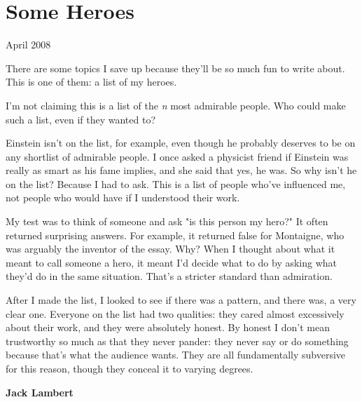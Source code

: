 \chapter{Some Heroes}


            
              
                

April 2008

There are some topics I save up because
                  they'll be so much fun to write about. This is one of them: a
                  list of my heroes.

I'm not claiming this is a list
                  of the \emph{n} most admirable people. Who could make such a
                  list, even if they wanted to?

Einstein isn't on the
                  list, for example, even though he probably deserves to be on
                  any shortlist of admirable people. I once asked a physicist
                  friend if Einstein was really as smart as his fame implies,
                  and she said that yes, he was. So why isn't he on the list?
                  Because I had to ask. This is a list of people who've
                  influenced me, not people who would have if I understood their
                  work.

My test was to think of someone and ask "is
                  this person my hero?" It often returned surprising answers.
                  For example, it returned false for Montaigne, who was arguably
                  the inventor of the essay. Why? When I thought about what it
                  meant to call someone a hero, it meant I'd decide what to do
                  by asking what they'd do in the same situation. That's a
                  stricter standard than admiration.

After I made the
                  list, I looked to see if there was a pattern, and there was, a
                  very clear one. Everyone on the list had two qualities: they
                  cared almost excessively about their work, and they were
                  absolutely honest. By honest I don't mean trustworthy so much
                  as that they never pander: they never say or do something
                  because that's what the audience wants. They are all
                  fundamentally subversive for this reason, though they conceal
                  it to varying degrees.


                  \textbf{Jack Lambert}

